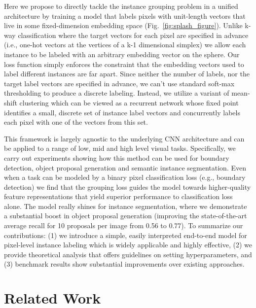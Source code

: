 \documentclass[10pt,twocolumn,letterpaper]{article}
\begin{document}
Here we propose to directly tackle the instance grouping problem in a unified
architecture by training a model that labels pixels with unit-length vectors
that live in some fixed-dimension embedding space
(Fig.~\ref{fig:splash_figure}).  Unlike k-way classification where the target
vectors for each pixel are specified in advance (i.e., one-hot vectors at the
vertices of a k-1 dimensional simplex) we allow each instance to be labeled
with an arbitrary embedding vector on the sphere.  Our loss function simply
enforces the constraint that the embedding vectors used to label different
instances are far apart.  Since neither the number of labels, nor the target
label vectors are specified in advance, we can't use standard soft-max
thresholding to produce a discrete labeling.  Instead, we utilize a
variant of mean-shift clustering which can be viewed as a recurrent network
whose fixed point identifies a small, discrete set of instance label vectors
and concurrently labels each pixel with one of the vectors from this set.

This framework is largely agnostic to the underlying CNN architecture and can
be applied to a range of low, mid and high level visual tasks. Specifically,
we carry out experiments showing how this method can be used for boundary
detection, object proposal generation and semantic instance segmentation. Even
when a task can be modeled by a binary pixel classification loss (e.g.,
boundary detection) we find that the grouping loss guides the model towards
higher-quality feature representations that yield superior performance to
classification loss alone. The model really shines for instance segmentation,
where we demonstrate a substantial boost in object proposal generation
(improving the state-of-the-art average recall for 10 proposals per image from
0.56 to 0.77).  To summarize our contributions: (1) we introduce a simple,
easily interpreted end-to-end model for pixel-level instance labeling which is
widely applicable and highly effective, (2) we provide theoretical analysis
that offers guidelines on setting hyperparameters, and (3) benchmark results
show substantial improvements over existing approaches.

\section{Related Work}
\end{document}
